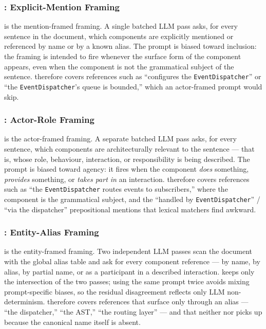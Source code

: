 \subsubsection{\linkerA: Explicit-Mention Framing}\label{sec:linkerA}

\linkerA is the mention-framed framing.
A single batched LLM pass asks, for every sentence in the document,
which components are explicitly mentioned or referenced by name or
by a known alias.
The prompt is biased toward inclusion: the framing is intended to
fire whenever the surface form of the component appears, even when
the component is not the grammatical subject of the sentence.
\linkerA therefore covers references such as ``configures the
\texttt{EventDispatcher}'' or ``the \texttt{EventDispatcher}'s
queue is bounded,'' which an actor-framed prompt would skip.

\subsubsection{\linkerB: Actor-Role Framing}\label{sec:linkerB}

\linkerB is the actor-framed framing.
A separate batched LLM pass asks, for every sentence, which
components are architecturally relevant to the sentence --- that
is, whose role, behaviour, interaction, or responsibility is
being described.
The prompt is biased toward agency: it fires when the component
\emph{does} something, \emph{provides} something, or \emph{takes
part in} an interaction.
\linkerB therefore covers references such as ``the
\texttt{EventDispatcher} routes events to subscribers,'' where the
component is the grammatical subject, and the
``handled by \texttt{EventDispatcher}'' / ``via the dispatcher''
prepositional mentions that lexical matchers find awkward.

\subsubsection{\linkerC: Entity-Alias Framing}\label{sec:linkerC}

\linkerC is the entity-framed framing.
Two independent LLM passes scan the document with the global alias
table and ask for every component reference --- by name, by alias,
by partial name, or as a participant in a described interaction.
\approach keeps only the intersection of the two passes; using the
same prompt twice avoids mixing prompt-specific biases, so the
residual disagreement reflects only LLM non-determinism.
\linkerC therefore covers references that surface only through an
alias --- ``the dispatcher,'' ``the AST,'' ``the routing layer'' ---
and that neither \linkerA nor \linkerB picks up because the
canonical name itself is absent.

